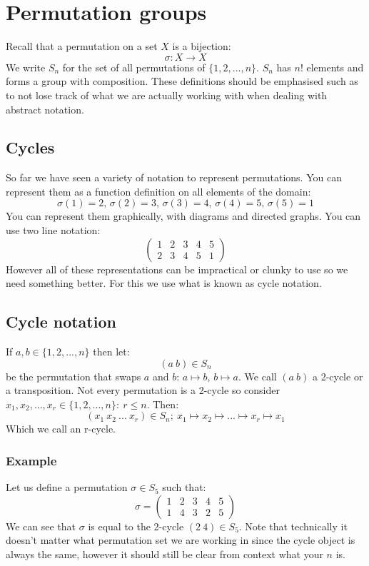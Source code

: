 \documentclass[12pt]{article}
\begin{document}
\section{Permutation groups}
Recall that a permutation on a set \(X\) is a bijection:
\[\sigma:X\to X\]
We write \(S_n\) for the set of all permutations of \(\{1,2,...,n\}\). \(S_n\) has \(n!\) elements and forms a group with composition. These definitions should be emphasised such as to not lose track of what we are actually working with when dealing with abstract notation.
\subsection*{Cycles}
So far we have seen a variety of notation to represent permutations. You can represent them as a function definition on all elements of the domain:
\[\sigma(1)=2,\,\sigma(2)=3,\,\sigma(3)=4,\,\sigma(4)=5,\,\sigma(5)=1\]
You can represent them graphically, with diagrams and directed graphs. You can use two line notation:
\[\begin{pmatrix}
    1 & 2 & 3 & 4 & 5 \\
    2 & 3 & 4 & 5 & 1
\end{pmatrix}\]
However all of these representations can be impractical or clunky to use so we need something better. For this we use what is known as cycle notation.
\subsection*{Cycle notation}
If \(a,b\in\{1,2,...,n\}\) then let:
\[(a\ b)\in S_n\]
be the permutation that swaps \(a\) and \(b\): \(a\mapsto b,\,b\mapsto a\). We call \((a\ b)\) a 2-cycle or a transposition. Not every permutation is a 2-cycle so consider \(x_1,x_2,...,x_r\in \{1,2,...,n\}:\ r\leq n\). Then:
\[(x_1\ x_2\ ...\ x_r)\in S_n;\ x_1\mapsto x_2\mapsto ...\mapsto x_r\mapsto x_1 \]
Which we call an r-cycle.
\subsubsection*{Example}
Let us define a permutation \(\sigma\in S_5\) such that:
\[\sigma= \begin{pmatrix}
    1 & 2 & 3 & 4 & 5 \\
    1 & 4 & 3 & 2 & 5
\end{pmatrix}\]
We can see that \(\sigma\) is equal to the 2-cycle \((2\ 4)\in S_5\). Note that technically it doesn't matter what permutation set we are working in since the cycle object is always the same, however it should still be clear from context what your \(n\) is.
\end{document}
